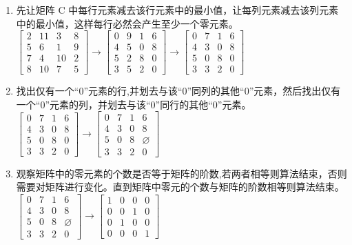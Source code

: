 \begin{enumerate}
	\item 先让矩阵 C 中每行元素减去该行元素中的最小值，让每列元素减去该列元素中的最小值，这样每行必然会产生至少一个零元素。\\
		$\begin{bmatrix}
			2 & 11 & 3 & 8 \\
			5 & 6 & 1 & 9 \\
			7 & 4 & 10 & 2 \\
			8 & 10 & 7 & 5
		\end{bmatrix} \longrightarrow
		\begin{bmatrix}
			0 & 9 & 1 & 6 \\
			4 & 5 & 0 & 8 \\
			5 & 2 & 8 & 0 \\
			3 & 5 & 2 & 0
		\end{bmatrix} \longrightarrow
		\begin{bmatrix}
			0 & 7 & 1 & 6 \\
			4 & 3 & 0 & 8 \\
			5 & 0 & 8 & 0 \\
			3 & 3 & 2 & 0
		\end{bmatrix}$
	\item 找出仅有一个``0''元素的行,并划去与该``0''同列的其他``0''元素，然后找出仅有一个``0''元素的列，并划去与该``0''同行的其他``0''元素。\\
		$\begin{bmatrix}
			0 & 7 & 1 & 6 \\
			4 & 3 & 0 & 8 \\
			5 & 0 & 8 & 0 \\
			3 & 3 & 2 & 0
		\end{bmatrix} \longrightarrow
		\begin{bmatrix}
			0 & 7 & 1 & 6 \\
			4 & 3 & 0 & 8 \\
			5 & 0 & 8 & \varnothing \\
			3 & 3 & 2 & 0
		\end{bmatrix}$
	\item 观察矩阵中的零元素的个数是否等于矩阵的阶数,若两者相等则算法结束，否则需要对矩阵进行变化。直到矩阵中零元的个数与矩阵的阶数相等则算法结束。\\
		$
		\begin{bmatrix}
			0 & 7 & 1 & 6 \\
			4 & 3 & 0 & 8 \\
			5 & 0 & 8 & \varnothing \\
			3 & 3 & 2 & 0
		\end{bmatrix} \longrightarrow
		\begin{bmatrix}
			1 & 0 & 0 & 0 \\
			0 & 0 & 1 & 0 \\
			0 & 1 & 0 & 0 \\
			0 & 0 & 0 & 1
		\end{bmatrix}$
\end{enumerate}

